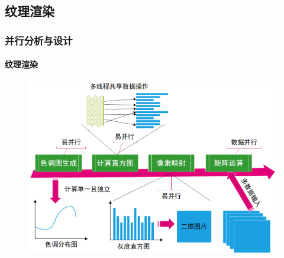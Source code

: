 \documentclass[aspectratio=43, xcolor=svgnames, t, 10pt]{beamer}
\begin{document}

\subsection{纹理渲染}
\begin{frame}
  \frametitle{并行分析与设计}
  \framesubtitle{纹理渲染}
  \begin{figure}
    \includegraphics[width=\linewidth]{./figure/texture_render_design.png}
  \end{figure}
\end{frame}

\end{document}
